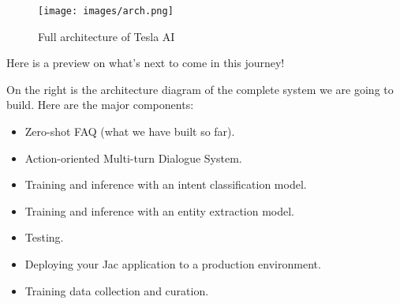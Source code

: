 \begin{figure}
\centering
\texttt{[image: images/arch.png]}
\caption{Full architecture of Tesla AI}
\end{figure}

Here is a preview on what's next to come in this journey!

On the right is the architecture diagram of the complete system we are
going to build. Here are the major components:

\begin{itemize}
\tightlist
\item
  Zero-shot FAQ (what we have built so far).
\item
  Action-oriented Multi-turn Dialogue System.
\item
  Training and inference with an intent classification model.
\item
  Training and inference with an entity extraction model.
\item
  Testing.
\item
  Deploying your Jac application to a production environment.
\item
  Training data collection and curation.
\end{itemize}
